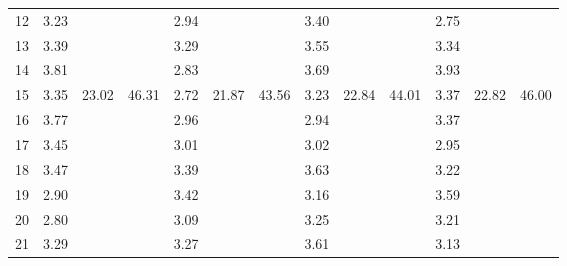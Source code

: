 \documentclass[%
 aip,
 jmp,%
 amsmath,amssymb,
 reprint,%
]{revtex4-1}
\begin{document}
\begin{table}
\begin{center}
\begin{tabular}{ |l|| c|c|c| c|c|c| c|c|c| c|c|c|}
12 & 3.23 &                        &                         & 2.94  & & & 3.40 & & & 2.75 & & \\
13 & 3.39 &                        &                         & 3.29  & & & 3.55 & & & 3.34 & & \\
14 & 3.81 &                        &                         & 2.83  & & & 3.69 & & & 3.93 & & \\\hline
15 & 3.35 & \multirow{7}{*}{23.02} & \multirow{14}{*}{46.31} & 2.72  & \multirow{7}{*}{21.87} & \multirow{14}{*}{ 43.56} & 3.23 & \multirow{7}{*}{22.84} &  \multirow{14}{*}{ 44.01 } & 3.37 & \multirow{7}{*}{22.82} &  \multirow{14}{*}{46.00} \\
16 & 3.77 &                        &                         & 2.96  & & & 2.94 & & & 3.37 & & \\
17 & 3.45 &                        &                         & 3.01  & & & 3.02 & & & 2.95 & & \\
18 & 3.47 &                        &                         & 3.39  & & & 3.63 & & & 3.22 & & \\
19 & 2.90 &                        &                         & 3.42  & & & 3.16 & & & 3.59 & & \\
20 & 2.80 &                        &                         & 3.09  & & & 3.25 & & & 3.21 & & \\
21 & 3.29 &                        &                         & 3.27  & & & 3.61 & & & 3.13 & & \\\cline{3-3}\cline{6-6}\cline{9-9}\cline{12-12}


\end{tabular}
\end{center}
\end{table}
\end{document}
